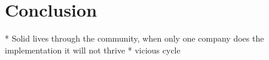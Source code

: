 \chapter{Conclusion}
\setcounter{section}{0}

* Solid lives through the community, when only one company does the implementation it will not thrive
* vicious cycle